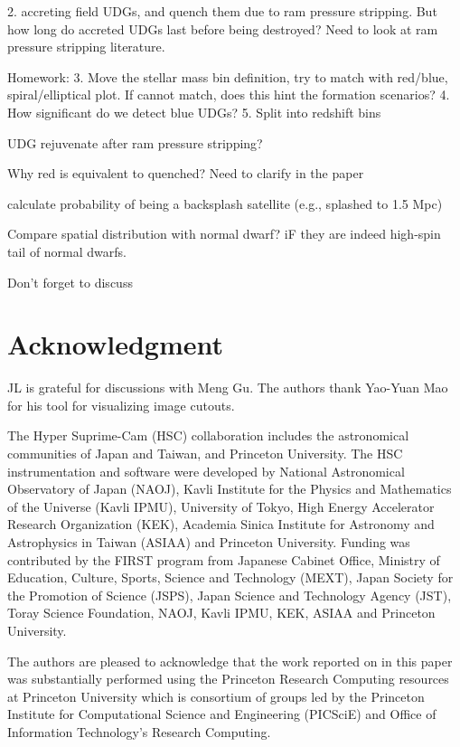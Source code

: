 \documentclass[twocolumn,astrosymb,twocolappendix]{aastex631}
\begin{document}
\begin{CJK*}{UTF8}{gbsn}
2. accreting field UDGs, and quench them due to ram pressure stripping. But how long do accreted UDGs last before being destroyed? Need to look at ram pressure stripping literature.

Homework:
3. Move the stellar mass bin definition, try to match with red/blue, spiral/elliptical plot. If cannot match, does this hint the formation scenarios?
4. How significant do we detect blue UDGs? 
5. Split into redshift bins


UDG rejuvenate after ram pressure stripping?

Why red is equivalent to quenched? Need to clarify in the paper

calculate probability of being a backsplash satellite (e.g., splashed to 1.5 Mpc)

Compare spatial distribution with normal dwarf? iF they are indeed high-spin tail of normal dwarfs. 

Don't forget to discuss \citep{xSAGA-I}


\section*{Acknowledgment}
JL is grateful for discussions with Meng Gu. The authors thank Yao-Yuan Mao for his tool for visualizing image cutouts. 

The Hyper Suprime-Cam (HSC) collaboration includes the astronomical communities of Japan and Taiwan, and Princeton University. The HSC instrumentation and software were developed by National Astronomical Observatory of Japan (NAOJ), Kavli Institute for the Physics and Mathematics of the Universe (Kavli IPMU), University of Tokyo, High Energy Accelerator Research Organization (KEK), Academia Sinica Institute for Astronomy and Astrophysics in Taiwan (ASIAA) and Princeton University.  
Funding was contributed by the FIRST program from Japanese Cabinet Office, Ministry of Education, Culture, Sports, Science and Technology (MEXT), Japan Society for the Promotion of Science (JSPS), Japan Science and Technology Agency (JST), Toray Science Foundation, NAOJ, Kavli IPMU, KEK, ASIAA and Princeton University.

The authors are pleased to acknowledge that the work reported on in this paper was substantially performed using the Princeton Research Computing resources at Princeton University which is consortium of groups led by the Princeton Institute for Computational Science and Engineering (PICSciE) and Office of Information Technology's Research Computing.


\end{CJK*}
\end{document}
